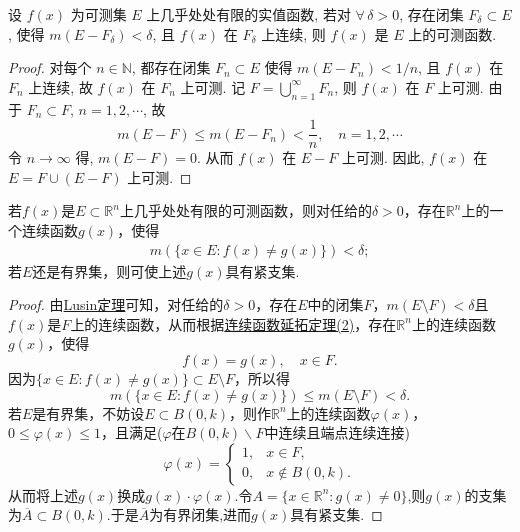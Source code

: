 \documentclass[../../main.tex]{subfiles}
\begin{document}
\begin{theorem}\label{theorem:Lusin定理的逆定理}
设 \( f(x) \) 为可测集 \( E \) 上几乎处处有限的实值函数, 若对 \( \forall\,\delta > 0 \), 存在闭集 \( F_{\delta} \subset E \), 使得 \( m(E - F_{\delta}) < \delta \), 且 \( f(x) \) 在 \( F_{\delta} \) 上连续, 则 \( f(x) \) 是 \( E \) 上的可测函数.
\end{theorem}
\begin{proof}
对每个 \( n \in \mathbb{N} \), 都存在闭集 \( F_{n} \subset E \) 使得 \( m(E - F_{n}) < 1/n \), 且 \( f(x) \) 在 \( F_{n} \) 上连续, 故 \( f(x) \) 在 \( F_{n} \) 上可测.
记 \( F = \bigcup_{n = 1}^{\infty} F_{n} \), 则 \( f(x) \) 在 \( F \) 上可测. 由于 \( F_{n} \subset F \), \( n = 1, 2, \cdots \), 故
\[
m(E - F) \leqslant m(E - F_{n}) < \frac{1}{n}, \quad n = 1, 2, \cdots
\]
令 \( n \to \infty \) 得, \( m(E - F) = 0 \). 从而 \( f(x) \) 在 \( E - F \) 上可测. 因此, \( f(x) \) 在 \( E = F \cup (E - F) \) 上可测.
\end{proof}

\begin{corollary}\label{corollary:推论3.19}
若\(f(x)\)是\(E \subset \mathbb{R}^{n}\)上几乎处处有限的可测函数，则对任给的\(\delta > 0\)，存在\(\mathbb{R}^{n}\)上的一个连续函数\(g(x)\)，使得
\begin{align*}
m(\{x \in E: f(x) \neq g(x)\}) < \delta; 
\end{align*}
若\(E\)还是有界集，则可使上述\(g(x)\)具有紧支集.
\end{corollary}
\begin{proof}
由\hyperref[theorem:Lusin(卢津)定理]{Lusin定理}可知，对任给的\(\delta > 0\)，存在\(E\)中的闭集\(F\)，\(m(E \setminus F) < \delta\)且\(f(x)\)是\(F\)上的连续函数，从而根据\hyperref[theorem:连续函数延拓定理]{连续函数延拓定理(2)}，存在\(\mathbb{R}^{n}\)上的连续函数\(g(x)\)，使得
\[f(x) = g(x), \quad x \in F.\]
因为\(\{x \in E: f(x) \neq g(x)\} \subset E \setminus F\)，所以得
\[m(\{x \in E: f(x) \neq g(x)\}) \leqslant m(E \setminus F) < \delta.\]
若\(E\)是有界集，不妨设\(E \subset B(0, k)\)，则作\(\mathbb{R}^{n}\)上的连续函数\(\varphi(x)\)，\(0 \leqslant \varphi(x) \leqslant 1\)，且满足($\varphi$在$B(0,k)\backslash F$中连续且端点连续连接)
\[\varphi(x) = 
\begin{cases}
1, & x \in F, \\
0, & x \notin B(0, k).
\end{cases}\]
从而将上述\(g(x)\)换成\(g(x) \cdot \varphi(x)\).令$A=\{x\in \mathbb{R}^n:g(x)\ne 0\}$,则$g(x)$的支集为$\overline{A}\subset B(0,k)$.于是$\overline{A}$为有界闭集,进而$g(x)$具有紧支集.
\end{proof}
\end{document}
